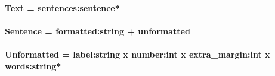 \documentclass{article}
\newcommand{\domain}[2]{\paragraph{{#1}}\paragraph{}{\em #2}}
\begin{document}
\sloppy

\domain{Text = sentences:sentence*}
{}

\domain{Sentence = formatted:string + unformatted}
{}

\domain{Unformatted = label:string x number:int x extra\_margin:int x  words:string*}
{}
\end{document}
